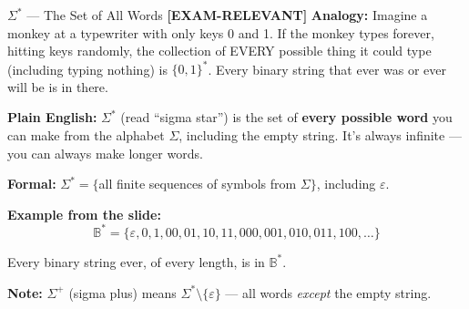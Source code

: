 \documentclass[11pt,a4paper]{article}
\newcommand{\kemark}{\textcolor{red!70!black}{\textbf{[EXAM-RELEVANT]}}}
\begin{document}
\begin{definitionbox}{$\Sigma^*$ --- The Set of All Words \kemark}
\textbf{Analogy:} Imagine a monkey at a typewriter with only keys 0 and 1. If the monkey types forever, hitting keys randomly, the collection of EVERY possible thing it could type (including typing nothing) is $\{0,1\}^*$. Every binary string that ever was or ever will be is in there.

\textbf{Plain English:} $\Sigma^*$ (read ``sigma star'') is the set of \textbf{every possible word} you can make from the alphabet $\Sigma$, including the empty string. It's always infinite --- you can always make longer words.

\textbf{Formal:} $\Sigma^* = \{$all finite sequences of symbols from $\Sigma\}$, including $\varepsilon$.

\textbf{Example from the slide:}
$$\mathbb{B}^* = \{\varepsilon, 0, 1, 00, 01, 10, 11, 000, 001, 010, 011, 100, \ldots\}$$

Every binary string ever, of every length, is in $\mathbb{B}^*$.

\textbf{Note:} $\Sigma^+$ (sigma plus) means $\Sigma^* \setminus \{\varepsilon\}$ --- all words \textit{except} the empty string.
\end{definitionbox}
\end{document}
